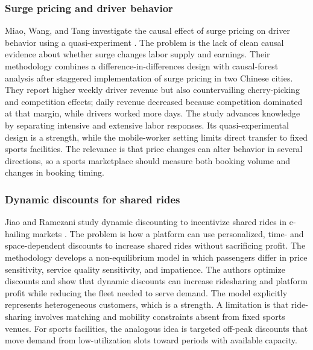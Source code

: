 \subsubsection{Surge pricing and driver behavior}
Miao, Wang, and Tang investigate the causal effect of surge pricing on driver behavior using a quasi-experiment \cite{r4}. The problem is the lack of clean causal evidence about whether surge changes labor supply and earnings. Their methodology combines a difference-in-differences design with causal-forest analysis after staggered implementation of surge pricing in two Chinese cities. They report higher weekly driver revenue but also countervailing cherry-picking and competition effects; daily revenue decreased because competition dominated at that margin, while drivers worked more days. The study advances knowledge by separating intensive and extensive labor responses. Its quasi-experimental design is a strength, while the mobile-worker setting limits direct transfer to fixed sports facilities. The relevance is that price changes can alter behavior in several directions, so a sports marketplace should measure both booking volume and changes in booking timing.

\subsubsection{Dynamic discounts for shared rides}
Jiao and Ramezani study dynamic discounting to incentivize shared rides in e-hailing markets \cite{r5}. The problem is how a platform can use personalized, time- and space-dependent discounts to increase shared rides without sacrificing profit. The methodology develops a non-equilibrium model in which passengers differ in price sensitivity, service quality sensitivity, and impatience. The authors optimize discounts and show that dynamic discounts can increase ridesharing and platform profit while reducing the fleet needed to serve demand. The model explicitly represents heterogeneous customers, which is a strength. A limitation is that ride-sharing involves matching and mobility constraints absent from fixed sports venues. For sports facilities, the analogous idea is targeted off-peak discounts that move demand from low-utilization slots toward periods with available capacity.

